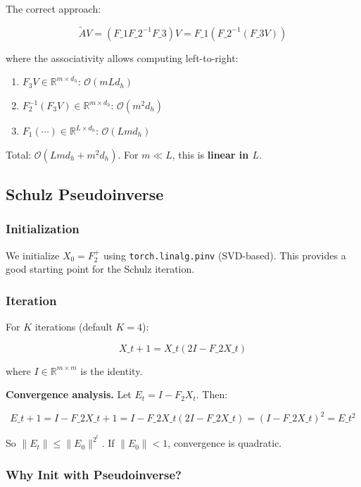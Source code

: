 The correct approach:

\[
\tilde{A} V = (F\_1 F\_2^{-1} F\_3) V = F\_1 (F\_2^{-1} (F\_3 V))
\]

where the associativity allows computing left-to-right:

\begin{enumerate}
\item $F_3 V \in \mathbb{R}^{m \times d_h}$: $\mathcal{O}(m L d_h)$
\item $F_2^{-1} (F_3 V) \in \mathbb{R}^{m \times d_h}$: $\mathcal{O}(m^2 d_h)$
\item $F_1 (\cdots) \in \mathbb{R}^{L \times d_h}$: $\mathcal{O}(L m d_h)$

\end{enumerate}
Total: $\mathcal{O}(L m d_h + m^2 d_h)$. For $m \ll L$, this is \textbf{linear in $L$}.

\subsection{Schulz Pseudoinverse}

\subsubsection{Initialization}

We initialize $X_0 = F_2^+$ using \texttt{torch.linalg.pinv} (SVD-based). This 
provides a good starting point for the Schulz iteration.

\subsubsection{Iteration}

For $K$ iterations (default $K = 4$):

\[
X\_{t+1} = X\_t (2I - F\_2 X\_t)
\]

where $I \in \mathbb{R}^{m \times m}$ is the identity.

\textbf{Convergence analysis.} Let $E_t = I - F_2 X_t$. Then:

\[
E\_{t+1} = I - F\_2 X\_{t+1} = I - F\_2 X\_t (2I - F\_2 X\_t) = (I - F\_2 X\_t)^2 = E\_t^2
\]

So $\|E_t\| \le \|E_0\|^{2^t}$. If $\|E_0\| < 1$, convergence is quadratic.

\subsubsection{Why Init with Pseudoinverse?}

